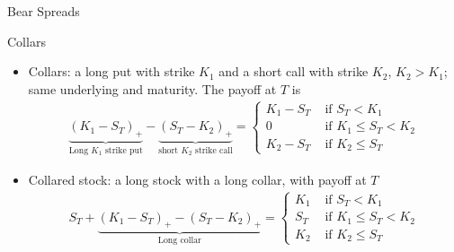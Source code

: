 \documentclass[10pt,handout]{beamer}
\theoremstyle{definition}
\begin{document}
\begin{frame}{Bear Spreads}
\begin{figure}[!htbp]
  \end{figure}
\end{frame}

\begin{frame}{Collars}
  \begin{itemize}
    \item Collars: a long put with strike $K_1$ and a short call with strike $K_2$, $K_2 > K_1$; same underlying and maturity. The payoff at $T$ is \vspace{-1mm}
      \begin{align*}
        \underbrace{(K_1 - S_T)_+}_{\text{Long }K_1\text{ strike put}} - \underbrace{(S_T - K_2)_+}_{\text{short }K_2\text{ strike call}} = \begin{cases}K_1 - S_T & \text{ if } S_T < K_1\\ 0 & \text{ if } K_1\leqslant S_T < K_2 \\ K_2 - S_T & \text{ if } K_2\leqslant S_T \end{cases}
      \end{align*}
    \item Collared stock: a long stock with a long collar, with payoff at $T$ \vspace{-1mm}
      \begin{align*}
        S_T + \underbrace{(K_1 - S_T)_+ - (S_T - K_2)_+}_{\text{Long collar}} = \begin{cases}K_1 & \text{ if } S_T < K_1\\ S_T & \text{ if } K_1\leqslant S_T < K_2 \\ K_2 & \text{ if } K_2\leqslant S_T \end{cases}
      \end{align*}
  \end{itemize}
  \vspace{-3mm}
  \begin{figure}[!htbp]
    \centering

\end{figure}
\end{frame}
\end{document}
